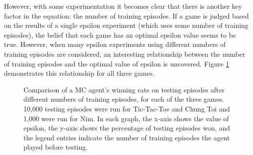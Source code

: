 \documentclass[11pt,a4paper,twoside,openright]{report}
\begin{document}
However, with some experimentation it becomes clear that there is another key factor in the equation: the number of training episodes. If a game is judged based on the results of a single epsilon experiment (which uses some number of training episodes), the belief that each game has an optimal epsilon value seems to be true. However, when many epsilon experiments using different numbers of training episodes are considered, an interesting relationship between the number of training episodes and the optimal value of epsilon is uncovered. Figure \ref{epsilon-win-comparisons} demonstrates this relationship for all three games.

\begin{figure}[htbp]
    \centering
    \caption{Comparison of a MC agent's winning rate on testing episodes after different numbers of training episodes, for each of the three games. 10,000 testing episodes were run for Tic-Tac-Toe and Chung Toi and 1,000 were run for Nim. In each graph, the x-axis shows the value of epsilon, the y-axis shows the percentage of testing episodes won, and the legend entries indicate the number of training episodes the agent played before testing.}
    \label{epsilon-win-comparisons}
\end{figure}
\end{document}

